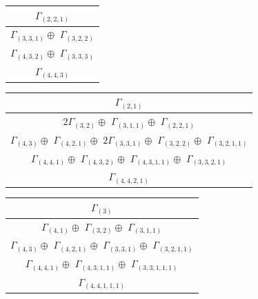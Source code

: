 \documentclass[main.tex]{subfiles}
\begin{document}
\begin{minipage}{.2\textwidth}
\centering
\begin{tabular}{c}
$\Gamma_{(
2 , 
2 , 
1
)}$
\\ \hline
$\Gamma_{(
3 , 
3 , 
1
)} \oplus$
$\Gamma_{(
3 , 
2 , 
2
)}$
\\ \hline
$\Gamma_{(
4 , 
3 , 
2
)} \oplus$
$\Gamma_{(
3 , 
3 , 
3
)}$
\\ \hline
$\Gamma_{(
4 , 
4 , 
3
)}$
\\
\end{tabular}\end{minipage}
\bigskip
\begin{minipage}{.5\textwidth}
\centering
\begin{tabular}{c}
$\Gamma_{(
2 , 
1
)}$
\\ \hline
$2\Gamma_{(
3 , 
2
)} \oplus$
$\Gamma_{(
3 , 
1 , 
1
)} \oplus$
$\Gamma_{(
2 , 
2 , 
1
)}$
\\ \hline
$\Gamma_{(
4 , 
3
)} \oplus$
$\Gamma_{(
4 , 
2 , 
1
)} \oplus$
$2\Gamma_{(
3 , 
3 , 
1
)} \oplus$
$\Gamma_{(
3 , 
2 , 
2
)} \oplus$
$\Gamma_{(
3 , 
2 , 
1 , 
1
)}$
\\ \hline
$\Gamma_{(
4 , 
4 , 
1
)} \oplus$
$\Gamma_{(
4 , 
3 , 
2
)} \oplus$
$\Gamma_{(
4 , 
3 , 
1 , 
1
)} \oplus$
$\Gamma_{(
3 , 
3 , 
2 , 
1
)}$
\\ \hline
$\Gamma_{(
4 , 
4 , 
2 , 
1
)}$
\\
\end{tabular}\end{minipage}
\begin{minipage}{.5\textwidth}
\centering
\begin{tabular}{c}
$\Gamma_{(
3
)}$
\\ \hline
$\Gamma_{(
4 , 
1
)} \oplus$
$\Gamma_{(
3 , 
2
)} \oplus$
$\Gamma_{(
3 , 
1 , 
1
)}$
\\ \hline
$\Gamma_{(
4 , 
3
)} \oplus$
$\Gamma_{(
4 , 
2 , 
1
)} \oplus$
$\Gamma_{(
3 , 
3 , 
1
)} \oplus$
$\Gamma_{(
3 , 
2 , 
1 , 
1
)}$
\\ \hline
$\Gamma_{(
4 , 
4 , 
1
)} \oplus$
$\Gamma_{(
4 , 
3 , 
1 , 
1
)} \oplus$
$\Gamma_{(
3 , 
3 , 
1 , 
1 , 
1
)}$
\\ \hline
$\Gamma_{(
4 , 
4 , 
1 , 
1 , 
1
)}$
\\
\end{tabular}\end{minipage}
\bigskip
\end{document}
